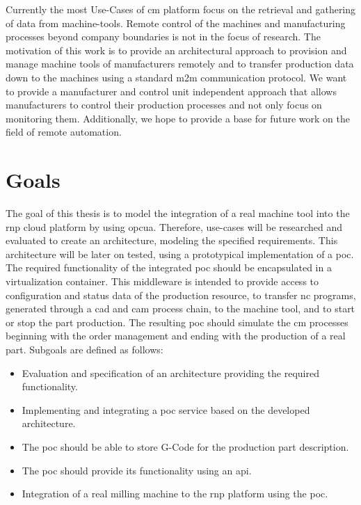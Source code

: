 \documentclass[
a4paper,
twoside,
headsepline,
cleardoublepage=empty,
parskip=half,
draft=false
]{scrbook}
\begin{document}
			Currently the most Use-Cases of \gls{cm} platform focus on the retrieval and gathering of data from machine-tools.
			Remote control of the machines and manufacturing processes beyond company boundaries is not in the focus of research.
			The motivation of this work is to provide an architectural approach to provision and manage machine tools of manufacturers remotely and to transfer production data down to the machines using a standard \gls{m2m} communication protocol.
			We want to provide a manufacturer and control unit independent approach that allows manufacturers to control their production processes and not only focus on monitoring them. Additionally, we hope to provide a base for future work on the field of remote automation.

		\section{Goals}\label{sec:goals}

			The goal of this thesis is to model the integration of a real machine tool into the \gls{rnp} cloud platform by using \gls{opcua}.
			Therefore, use-cases will be researched and evaluated to create an architecture, modeling the specified requirements.
			This architecture will be later on tested, using a prototypical implementation of a \gls{poc}.
			The required functionality of the integrated \gls{poc} should be encapsulated in a virtualization container.
			This middleware is intended to provide access to configuration and status data of the production resource, to transfer \gls{nc} programs, generated through a \gls{cad} and \gls{cam} process chain, to the machine tool, and to start or stop the part production. The resulting \gls{poc} should simulate the \gls{cm} processes beginning with the order management and ending with the production of a real part.
			Subgoals are defined as follows:

			\begin{itemize}

				\item Evaluation and specification of an architecture providing the required functionality.

				\item Implementing and integrating a \gls{poc} service based on the developed architecture.

				\item The \gls{poc} should be able to store G-Code for the production part description.

				\item The \gls{poc} should provide its functionality using  an \gls{api}.

				\item Integration of a real milling machine to the \gls{rnp} platform using the \gls{poc}.

			\end{itemize}
\end{document}

